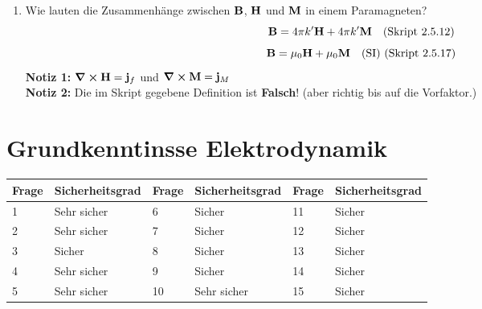 \documentclass{scrartcl}
\newcommand{\ds}{\displaystyle}
\begin{document}
\begin{enumerate}
    \item Wie lauten die Zusammenhänge zwischen $\vb B$, $\vb H$ 
          und $\vb M$ in einem Paramagneten?
          $$\vb B = 4\pi k'\vb H + 4\pi k'\vb M\quad\text{(Skript 2.5.12)}$$
          $$\vb B = \mu_0 \vb H + \mu_0 \vb M \quad\text{(SI) 
          (Skript 2.5.17)}$$
          \textbf{Notiz 1:} $\ds \curl \vb H = \vb j_f$ und 
          $\ds \curl \vb M=\vb j_M$\\
          \textbf{Notiz 2:} Die im Skript gegebene Definition ist 
          \textbf{Falsch}! (aber richtig bis auf die Vorfaktor.)
  \end{enumerate}
  \newpage
\section{Grundkenntinsse Elektrodynamik}
\setcounter{footnote}{0}
  \begin{center}
    \begin{tabular}{ll|ll|ll}
      \toprule
      Frage & Sicherheitsgrad & Frage & Sicherheitsgrad 
            & Frage & Sicherheitsgrad \\
      \midrule
      1& Sehr sicher      & 6 & Sicher     & 11& Sicher\\ 
      2& Sehr sicher      & 7 & Sicher     & 12& Sicher\\
      3& Sicher           & 8 & Sicher     & 13& Sicher\\
      4& Sehr sicher      & 9 & Sicher     & 14& Sicher\\
      5& Sehr sicher      & 10& Sehr sicher& 15& Sicher\\
      \bottomrule
    \end{tabular}
  \end{center}
\end{document}
